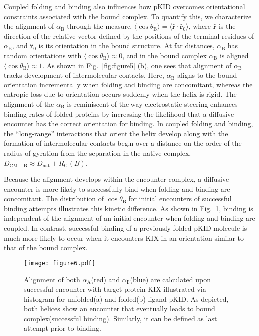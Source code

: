 \documentclass[../talant.diss.submit.tex]{subfiles}
\begin{document}
Coupled folding and binding also influences how pKID overcomes orientational
constraints associated with the bound complex. To quantify this, we characterize
the alignment of $\alpha_{\mathrm{B}}$ through the measure,
$\langle\cos\theta_\mathrm{B} \rangle = \langle
\hat{\mathbf{r}}\cdot\hat{\mathbf{r}}_0 \rangle$, where $\hat{\mathbf{r}}$ is
the direction of the relative vector defined by the positions of the terminal
residues of $\alpha_\mathrm{B}$, and $\hat{\mathbf{r}}_0$ is its orientation in
the bound structure.  At far distances, $\alpha_{\mathrm{B}}$ has random
orientations with $\langle\cos\theta_\mathrm{B}\rangle \approx 0$, and in the
bound complex $\alpha_{\mathrm{B}}$ is aligned
$\langle\cos\theta_\mathrm{B}\rangle \approx 1$.  As shown in
Fig.~\ref{fig:figure5} (b), one sees that alignment of $\alpha_{\mathrm{B}}$
tracks development of intermolecular contacts. Here, $\alpha_{\mathrm{B}}$
aligns to the bound orientation incrementally when folding and binding are
concomitant, whereas the entropic loss due to orientation occurs suddenly when
the helix is rigid.  The alignment of the $\alpha_{\mathrm{B}}$ is reminiscent
of the way electrostatic steering enhances binding rates of folded proteins by
increasing the likelihood that a diffusive encounter has the correct orientation
for binding.\cite{huangsteering:15,antosiewicz:96,tan:93} In coupled folding and
binding, the ``long-range'' interactions that orient the helix develop along
with the formation of intermolecular contacts begin over a distance on the order
of the radius of gyration from the separation in the native complex,
$D_\mathrm{CM-B} \approx D_\mathrm{nat} + R_\mathrm{G}(B)$.

Because the alignment develops within the encounter complex, a diffusive
encounter is more likely to successfully bind when folding and binding are
concomitant.  The distribution of $\cos\theta_\mathrm{B}$ for initial encounters
of successful binding attempts illustrates this kinetic difference.  As shown in
Fig.~\ref{fig:figure6}, binding is independent of the alignment of an initial
encounter when folding and binding are coupled. In contrast, successful binding
of a previously folded pKID molecule is much more likely to occur when it
encounters KIX in an orientation similar to that of the bound complex.

\begin{figure}[ht!]
  \centering
  \texttt{[image: figure6.pdf]}
  \caption{Alignment of both $\alpha_{\mathrm{A}}$(red) and $\alpha_{\mathrm{B}}$(blue) are calculated 
    upon successful encounter with target protein KIX illustrated via histogram
    for unfolded(a) and folded(b) ligand pKID. As depicted, both helices show an
    encounter that eventually leads to bound complex(successful binding). Similarly,
    it can be defined as last attempt prior to binding.}
  \label{fig:figure6}
\end{figure}
\end{document}
